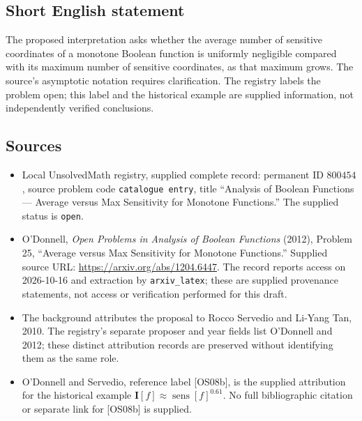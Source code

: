 \documentclass[11pt]{article}
\begin{document}
\subsection{Short English statement}
The proposed interpretation asks whether the average number of sensitive coordinates of a monotone Boolean function is uniformly negligible compared with its maximum number of sensitive coordinates, as that maximum grows. The source's asymptotic notation requires clarification. The registry labels the problem open; this label and the historical example are supplied information, not independently verified conclusions.
\subsection{Sources}
\begin{itemize}
\item Local UnsolvedMath registry, supplied complete record: permanent ID \(800454\), source problem code \texttt{catalogue entry}, title ``Analysis of Boolean Functions --- Average versus Max Sensitivity for Monotone Functions.'' The supplied status is \texttt{open}.
\item O'Donnell, \emph{Open Problems in Analysis of Boolean Functions} (2012), Problem 25, ``Average versus Max Sensitivity for Monotone Functions.'' Supplied source URL: \url{https://arxiv.org/abs/1204.6447}. The record reports access on 2026-10-16 and extraction by \texttt{arxiv\_latex}; these are supplied provenance statements, not access or verification performed for this draft.
\item The background attributes the proposal to Rocco Servedio and Li-Yang Tan, 2010. The registry's separate proposer and year fields list O'Donnell and 2012; these distinct attribution records are preserved without identifying them as the same role.
\item O'Donnell and Servedio, reference label [OS08b], is the supplied attribution for the historical example \(\mathbf I[f]\approx\operatorname{sens}[f]^{0.61}\). No full bibliographic citation or separate link for [OS08b] is supplied.
\end{itemize}
\end{document}
